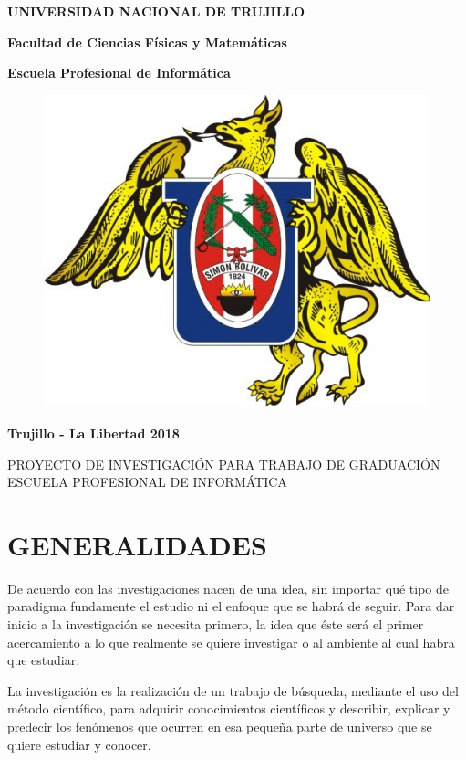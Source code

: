 \documentclass[a4paper, 12pt]{article}
\begin{document}
\begin{center}
 {\bf {\fontsize{14}{16.8}\selectfont UNIVERSIDAD NACIONAL DE TRUJILLO}}     
 
    {\bf{\fontsize{14}{16.8}\selectfont Facultad de Ciencias Físicas y Matemáticas}} 

  {\bf{\fontsize{14}{16.8}\selectfont Escuela Profesional de Informática}}
\end{center}  

\begin{figure}[ht]
\begin{center}
\includegraphics[width=.3\textwidth]{unt}
\end{center}
\end{figure}

\vskip 2cm
\begin{center}
  { \bf {\fontsize{17}{20.4}\selectfont{NOMBRE DEL TRABAJO DE GRADUACIÓN}}  } 
\end{center}   
  \vskip 1cm
  { \bf {\fontsize{17}{20.4}}  } 
  \vskip 1cm
  { \bf {\fontsize{17}{20.4}}  } 
\vskip 4cm
\begin{center}    
{\bf {\fontsize{14}{16.8}\selectfont Trujillo - La Libertad
\vskip 0.0cm
\hspace*{-0.2cm} 
\vskip 0.1cm
2018 }}
\end{center} 
\newpage

\begin{center}
\Large {PROYECTO DE INVESTIGACIÓN PARA TRABAJO DE GRADUACIÓN \\
\vskip 0.2cm
 ESCUELA PROFESIONAL DE INFORMÁTICA}
\end{center}
\vskip 1cm

\section{GENERALIDADES}
De acuerdo con  \cite{Erica} las investigaciones nacen de una idea, sin importar qué tipo de paradigma fundamente el estudio ni el enfoque que se habrá de seguir. Para dar inicio a la investigación se necesita primero, la idea que éste será el primer acercamiento a lo que realmente se quiere investigar o al ambiente al cual  habra que estudiar. \par
\vskip 0.3cm
La investigación es la realización de un trabajo de búsqueda, mediante el uso del método científico, para adquirir conocimientos científicos y describir, explicar y predecir los fenómenos que ocurren en esa pequeña parte de universo que se quiere estudiar y conocer.               
\end{document}
